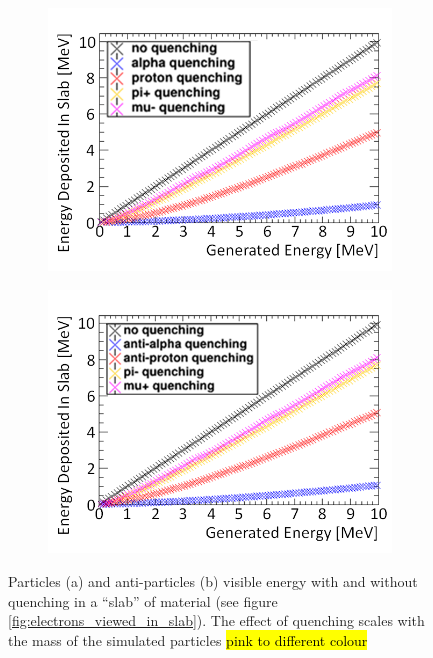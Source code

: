 \begin{figure}[!h]
\centering
\begin{subfigure}{.45\textwidth}
  \centering
  \includegraphics[width=\linewidth]{Chapter4/Figs/Raster/quenchingNormalComparison.png}
  \captionsetup{width=.9\linewidth}
  \caption{}
  \label{subFig:proton_quenched_and_not}
\end{subfigure}%
\begin{subfigure}{.45\textwidth}
  \centering
  \includegraphics[width=\linewidth]{Chapter4/Figs/Raster/quenchingAntiComparison.png}
  \captionsetup{width=.9\linewidth}
  \caption{}
  \label{subFig:Aproton_quenched_and_not}
\end{subfigure}
\caption[Particle and anti-particle visible energy in a slab of scintillator.]{Particles (a) and anti-particles (b) visible energy with and without quenching in a ``slab'' of material (see figure \ref{fig:electrons_viewed_in_slab}). The effect of quenching scales with the mass of the simulated particles \hl{pink to different colour}}
\label{fig:proton_Apronton_quenched_and_not}
\end{figure}

